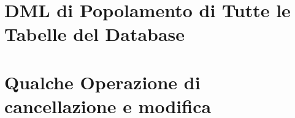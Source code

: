 \documentclass[letterpaper]{report}
\begin{document}
\section{DML di Popolamento di Tutte le Tabelle del Database}




\section{Qualche Operazione di cancellazione e modifica}

\end{document}
